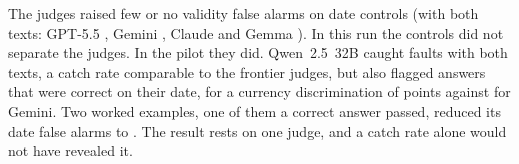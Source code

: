 The judges raised few or no validity false alarms on date controls (with both texts: GPT-5.5 \EGPTDateFATexts,
Gemini \EGeminiDateFATexts, Claude \EOpusDateFATexts{} and Gemma \EGemmaDateFATexts). In this run the controls
did not separate the judges. In the pilot they did. Qwen~2.5~32B caught \RfcCatchBothTextsQwenThreeTwoB{} faults with
both texts, a catch rate comparable to the frontier judges, but also flagged \RfcDateFABothTextsQwenThreeTwoB{} answers
that were correct on their date, for a currency discrimination of \RfcDiscDateBothTextsQwenThreeTwoB{} points against
\RfcDiscDateBothTextsGeminiThreeOnePro{} for Gemini. Two worked examples, one of them a correct answer passed, reduced
its date false alarms to \RfcDateFAFewShotQwenThreeTwoB. The result rests on one judge, and a catch rate alone would not
have revealed it.
